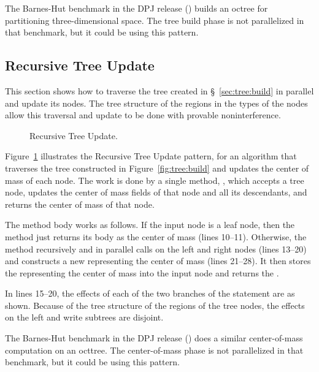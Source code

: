 The Barnes-Hut benchmark in the DPJ release
() builds an octree for
partitioning three-dimensional space.  The tree build phase is not
parallelized in that benchmark, but it could be using this pattern.

\subsection{Recursive Tree Update%
\label{sec:tree:update}}

This section shows how to traverse the tree created in
\S~\ref{sec:tree:build} in parallel and update its nodes.  The tree
structure of the regions in the types of the nodes allow this
traversal and update to be done with provable noninterference.

\begin{figure}

\caption{Recursive Tree Update.}
\label{fig:tree:update}
\end{figure}

 Figure~\ref{fig:tree:update}
illustrates the Recursive Tree Update pattern, for an algorithm that
traverses the tree constructed in Figure~\ref{fig:tree:build} and
updates the center of mass of each node.  The work is done by a single
method, , which accepts a tree node, updates
the center of mass fields of that node and all its descendants, and
returns the center of mass of that node.

The method body works as follows.  If the input node is a leaf node,
then the method just returns its body as the center of mass (lines
10--11).  Otherwise, the method recursively and in parallel calls
 on the left and right nodes (lines 13--20)
and constructs a new  representing the center of mass (lines
21--28).  It then stores the  representing the center of
mass into the input node and returns the .

In lines 15--20, the effects of each of the two branches of the
 statement are as shown.  Because of the tree structure
of the regions of the tree nodes, the effects on the left and write
subtrees are disjoint.

 The Barnes-Hut benchmark in the DPJ release
() does a similar
center-of-mass computation on an octtree.  The center-of-mass phase is
not parallelized in that benchmark, but it could be using this
pattern.


